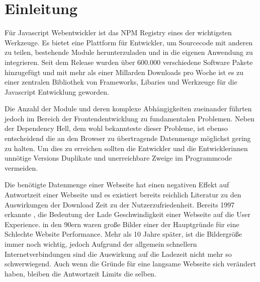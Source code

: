 \section{Einleitung}

Für Javascript Webentwickler ist das NPM Registry eines der wichtigsten Werkzeuge. Es bietet eine Plattform für Entwickler, um Sourcecode mit anderen zu teilen, bestehende Module herunterzuladen und in die eigenen Anwendung zu integrieren. Seit dem Release wurden über 600.000 verschiedene Software Pakete hinzugefügt und mit mehr als einer Millarden Downloads pro Woche ist es zu einer zentralen Bibliothek von Frameworks, Libaries und Werkzeuge für die Javascript Entwicklung geworden. \autocite{Npmdocs}

Die Anzahl der Module und deren komplexe Abhängigkeiten zueinander führten jedoch im Bereich der Frontendentwicklung zu fundamentalen Problemen. Neben der Dependency Hell, dem wohl bekannteste dieser Probleme, ist ebenso entscheidend die an den Browser zu übertragende Datenmenge möglichst gering zu halten. Um dies zu erreichen sollten die Entwickler und die Entwicklerinnen unnötige Versions Duplikate und unerreichbare Zweige im Programmcode vermeiden.\autocite{DominikWilkowski}

Die benötigte Datenmenge einer Webseite hat einen negativen Effekt auf Antwortzeit einer Webseite und es existiert bereits reichlich Literatur zu den Auswirkungen der Download Zeit zu der Nutzerzufriedenheit. Bereits 1997 erkannte \textcite{Nielson1997}, die Bedeutung der Lade Geschwindigkeit einer Webseite auf die User Experience. in den 90ern waren große Bilder einer der Hauptgründe für eine Schlechte Website Performance. Mehr als 10 Jahre später, ist die Bildergröße immer noch wichtig, jedoch Aufgrund der allgemein schnellern Internetverbindungen sind die Auswirkung auf die Ladezeit nicht mehr so schwerwiegend. Auch wenn die Gründe für eine langsame Webseite sich verändert haben, bleiben die Antwortzeit Limits die selben. \autocite{Nielson2010}

